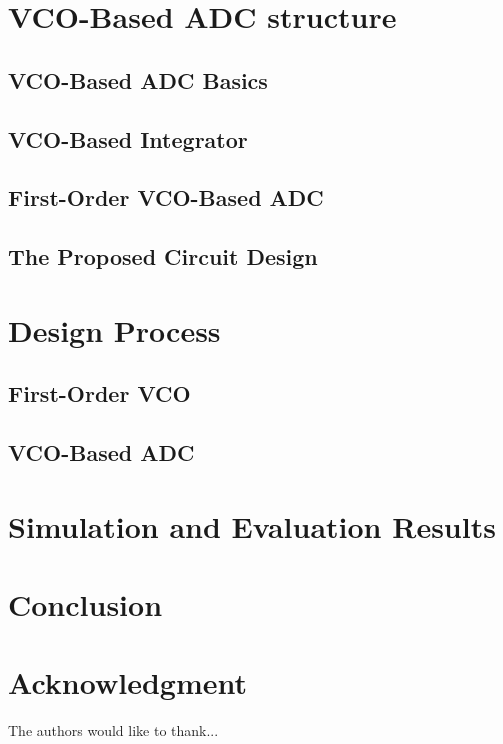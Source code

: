 \documentclass[journal]{IEEEtran}
\begin{document}
\section{VCO-Based ADC structure}
\subsection{VCO-Based ADC Basics}
\subsection{VCO-Based Integrator}
\subsection{First-Order VCO-Based ADC}
\subsection{The Proposed Circuit Design}
\section{Design Process}
\subsection{First-Order VCO}
\subsection{VCO-Based ADC}

\section{Simulation and Evaluation Results}

\section{Conclusion}

\section*{Acknowledgment} %
The authors would like to thank...

\ifCLASSOPTIONcaptionsoff
  \newpage
\fi




\end{document}
